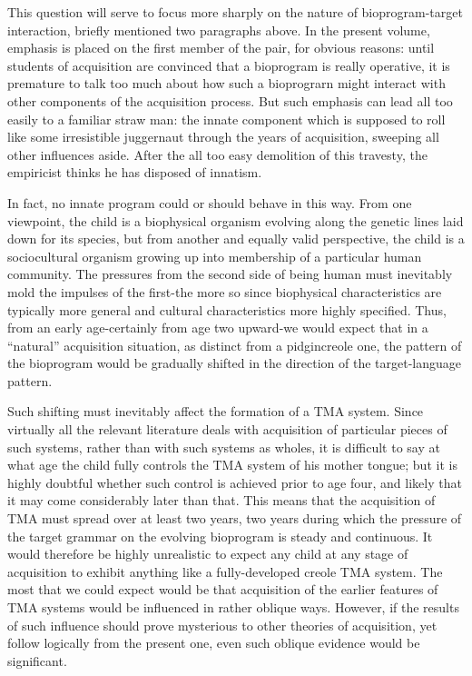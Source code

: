 This question will serve to focus more sharply on the nature of bioprogram-target interaction, briefly mentioned two paragraphs above. In the present volume, emphasis is placed on the first member of the pair, for obvious reasons: until students of acquisition are convinced that a bioprogram is really operative, it is premature to talk too much about how such a bioprograrn might interact with other components of the acquisition process. But such emphasis can lead all too easily to a familiar straw man: the innate component which is supposed to roll like some irresistible juggernaut through the years of acquisition, sweeping all other influences aside. After the all too easy demolition of this travesty, the empiricist thinks he has disposed of innatism.

In fact, no innate program could or should behave in this way. From one viewpoint, the child is a biophysical organism evolving along the genetic lines laid down for its species, but from another and equally valid perspective, the child is a sociocultural organism growing up into membership of a particular human community. The pressures from the second side of being human must inevitably mold the impulses of the first-the more so since biophysical characteristics are typically more general and cultural characteristics more highly specified. Thus, from an early age-certainly from age two upward-we would expect that in a ``natural'' acquisition situation, as distinct from a pidgin\-creole one, the pattern of the bioprogram would be gradually shifted in the direction of the target-language pattern.

Such shifting must inevitably affect the formation of a TMA
system. Since virtually all the relevant literature deals with acquisition of particular pieces of such systems, rather than with such systems as wholes, it is difficult to say at what age the child fully controls the TMA system of his mother tongue; but it is highly doubtful whether such control is achieved prior to age four, and likely that it may come considerably later than that. This means that the acquisition of TMA must spread over at least two years, two years during which the pres\-sure of the target grammar on the evolving bioprogram is steady and continuous. It would therefore be highly unrealistic to expect any child at any stage of acquisition to exhibit anything like a fully-developed creole TMA system. The most that we could expect would be that acquisition of the earlier features of TMA systems would be influ\-enced in rather oblique ways. However, if the results of such influence should prove mysterious to other theories of acquisition, yet follow logically from the present one, even such oblique evidence would be significant.

